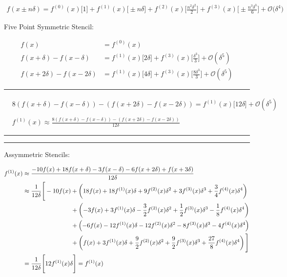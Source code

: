 \documentclass{article}
\begin{document}
\begin{align*}
f(x \pm n \delta) = f^{(0)}(x) \Big[ 1 \Big] + f^{(1)}(x) \Big[ \pm n \delta \Big] + f^{(2)}(x) \Big[ \frac{n^2 \delta^2}{2} \Big] + f^{(3)}(x) \Big[ \pm \frac{n^3 \delta^3}{6} \Big] + \mathcal{O} \big(\delta^4 \big)
\end{align*}


\vspace{2cm}
Five Point Symmetric Stencil:

\begin{align*}
f(x) &= f^{(0)}(x) \\
f(x+\delta) - f(x-\delta) &= f^{(1)}(x) \Big[ 2 \delta \Big] + f^{(3)}(x) \Big[ \frac{\delta^3}{3} \Big] + \mathcal{O}(\delta^5)\\
f(x+2\delta) - f(x - 2 \delta) &= f^{(1)}(x) \Big[4 \delta \Big] + f^{(3)}(x) \Big[ \frac{8 \delta^3}{3}\Big] + \mathcal{O}(\delta^5)
\end{align*}

\hrule
\begin{align}
&8 \left( f(x+\delta) - f(x-\delta) \right) - \left( f(x+2\delta) - f(x-2\delta) \right) = f^{(1)}(x) \Big[12 \delta \Big] + \mathcal{O}(\delta^5) \\
&\nonumber \\
&f^{(1)}(x) \approx \frac{8 \left( f(x+\delta) - f(x-\delta) \right) - \left( f(x+2\delta) - f(x-2\delta) \right)}{12 \delta}
\end{align}

\hrule

\hrule

Assymmetric Stencils:

\begin{align}
f^{(1)}(x) &\approx \frac{ -10 f(x) + 18 f(x+\delta) - 3 f(x-\delta) - 6 f(x+2\delta) + f(x+3\delta)}{12 \delta} \\
&\approx \frac{1}{12 \delta} \Bigg[ -10 f(x) + \left( 18 f(x) + 18 f^{(1)}(x) \delta + 9 f^{(2)} (x) \delta^2 + 3 f^{(3)}(x) \delta^3 + \frac{3}{4} f^{(4)}(x) \delta^4 \right) \nonumber\\
& \hspace{2.75cm} + \left( -3 f(x) + 3 f^{(1)}(x) \delta - \frac{3}{2} f^{(2)} (x) \delta^2 + \frac{1}{2} f^{(3)}(x) \delta^3 - \frac{1}{8} f^{(4)}(x) \delta^4  \right) \nonumber\\
& \hspace{2.75cm} + \left( -6 f(x) - 12 f^{(1)}(x) \delta - 12 f^{(2)} (x) \delta^2 - 8 f^{(3)}(x) \delta^3 - 4 f^{(4)}(x) \delta^4  \right) \nonumber\\
& \hspace{2.75cm} + \left( f(x) + 3 f^{(1)}(x) \delta + \frac{9}{2} f^{(2)} (x) \delta^2 + \frac{9}{2} f^{(3)}(x) \delta^3 + \frac{27}{8} f^{(4)}(x) \delta^4  \right) \Bigg] \nonumber \\
&= \frac{1}{12 \delta} \Bigg[ 12 f^{(1)}(x) \delta \Bigg] = f^{(1)}(x) \nonumber
\end{align}
\end{document}
